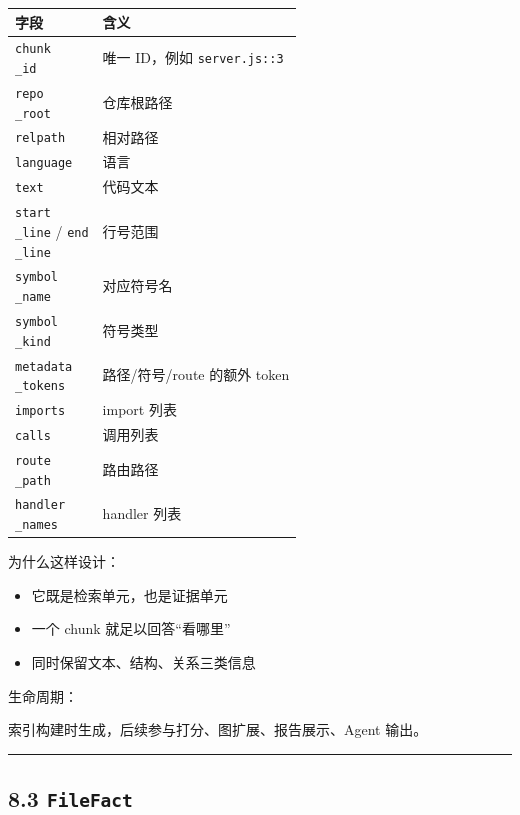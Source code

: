\documentclass[UTF8,12pt,openany]{ctexbook}
\begin{document}
\begin{center}
\small
\begin{longtable}{|p{}|p{}|}
\toprule
字段 & 含义 \\
\midrule
\texttt{chunk\\_id} & 唯一 ID，例如 \texttt{server.js::3} \\
\texttt{repo\\_root} & 仓库根路径 \\
\texttt{relpath} & 相对路径 \\
\texttt{language} & 语言 \\
\texttt{text} & 代码文本 \\
\texttt{start\\_line} / \texttt{end\\_line} & 行号范围 \\
\texttt{symbol\\_name} & 对应符号名 \\
\texttt{symbol\\_kind} & 符号类型 \\
\texttt{metadata\\_tokens} & 路径/符号/route 的额外 token \\
\texttt{imports} & import 列表 \\
\texttt{calls} & 调用列表 \\
\texttt{route\\_path} & 路由路径 \\
\texttt{handler\\_names} & handler 列表 \\
\bottomrule
\end{longtable}
\end{center}

为什么这样设计：\par

\begin{itemize}
\item 它既是检索单元，也是证据单元
\item 一个 chunk 就足以回答“看哪里”
\item 同时保留文本、结构、关系三类信息
\end{itemize}

生命周期：\par

索引构建时生成，后续参与打分、图扩展、报告展示、Agent 输出。\par

\hrule

\subsection{8.3 \texttt{FileFact}}
\end{document}
